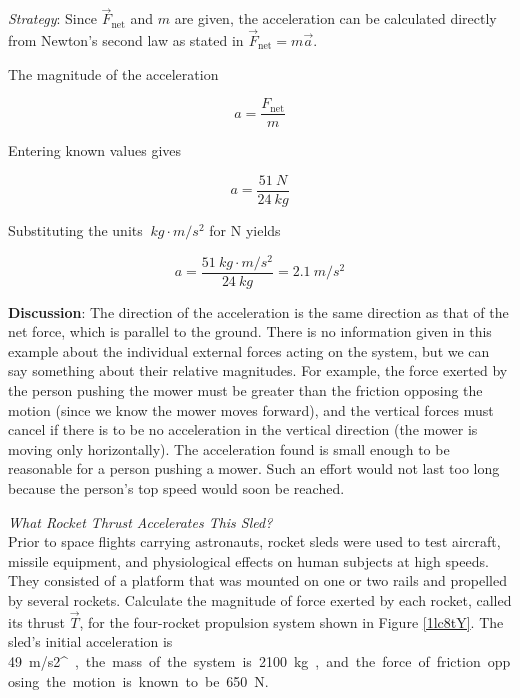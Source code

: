 \documentclass[../../main-ap-physics.tex]{subfiles}
\begin{document}
\Solution \textit{Strategy}: Since $\vec{F}_{\text{net}}$ and $m$ are given, the acceleration can be calculated directly from Newton’s second law as stated in $\vec{F}_{\text{net}} = m \vec{a}$.

\vspace{1em}


The magnitude of the acceleration

\begin{equation*}
    a = \frac{F_{\text{net}}}{m}
\end{equation*}

Entering known values gives

\begin{equation*}
    a = \frac{\SI{51}{N}}{\SI{24}{kg}}
\end{equation*}

Substituting the units $\SI{}{kg \cdot m/s^2}$ for N yields

\begin{equation*}
    a = \frac{\SI{51}{kg \cdot m/s^2}}{\SI{24}{kg}} = \SI{2.1}{m/s^2}
\end{equation*}

\textbf{Discussion}: The direction of the acceleration is the same direction as that of the net force, which is parallel to the ground. There is no information given in this example about the individual external forces acting on the system, but we can say something about their relative magnitudes. For example, the force exerted by the person pushing the mower must be greater than the friction opposing the motion (since we know the mower moves forward), and the vertical forces must cancel if there is to be no acceleration in the vertical direction (the mower is moving only horizontally). The acceleration found is small enough to be reasonable for a person pushing a mower. Such an effort would not last too long because the person’s top speed would soon be reached.

\endsolution

\begin{example}
    \textit{What Rocket Thrust Accelerates This Sled?}\\
    Prior to space flights carrying astronauts, rocket sleds were used to test aircraft, missile equipment, and physiological effects on human subjects at high speeds. They consisted of a platform that was mounted on one or two rails and propelled by several rockets. Calculate the magnitude of force exerted by each rocket, called its thrust $\vec{T}$, for the four-rocket propulsion system shown in Figure \ref{1lc8tY}. The sled's initial acceleration is  \SI{49}{m/s2^}, the mass of the system is \SI{2100}{kg}, and the force of friction opposing the motion is known to be \SI{650}{N}.
\end{example}
\end{document}
